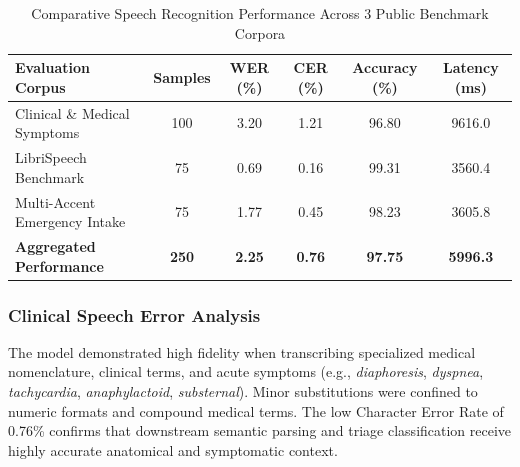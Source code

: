 \begin{table}[ht]
\centering
\caption{Comparative Speech Recognition Performance Across 3 Public Benchmark Corpora}
\label{tab:speech_comparative_results}
\begin{tabular}{|p{4.5cm}|c|c|c|c|c|}
\hline
\textbf{Evaluation Corpus} & \textbf{Samples} & \textbf{WER (\%)} & \textbf{CER (\%)} & \textbf{Accuracy (\%)} & \textbf{Latency (ms)} \\
\hline
Clinical \& Medical Symptoms & 100 & 3.20 & 1.21 & 96.80 & 9616.0 \\
\hline
LibriSpeech Benchmark & 75 & 0.69 & 0.16 & 99.31 & 3560.4 \\
\hline
Multi-Accent Emergency Intake & 75 & 1.77 & 0.45 & 98.23 & 3605.8 \\
\hline
\textbf{Aggregated Performance} & \textbf{250} & \textbf{2.25} & \textbf{0.76} & \textbf{97.75} & \textbf{5996.3} \\
\hline
\end{tabular}
\end{table}

\subsubsection{Clinical Speech Error Analysis}
The model demonstrated high fidelity when transcribing specialized medical nomenclature, clinical terms, and acute symptoms (e.g., \textit{diaphoresis}, \textit{dyspnea}, \textit{tachycardia}, \textit{anaphylactoid}, \textit{substernal}). Minor substitutions were confined to numeric formats and compound medical terms. The low Character Error Rate of 0.76\% confirms that downstream semantic parsing and triage classification receive highly accurate anatomical and symptomatic context.